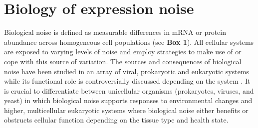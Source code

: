 
\section{Biology of expression noise} 

Biological noise is defined as measurable differences in \gls{mRNA} or protein abundance across homogeneous cell populations (see \textbf{Box 1}). All cellular systems are exposed to varying levels of noise and employ strategies to make use of or cope with this source of variation. The sources and consequences of biological noise have been studied in an array of viral, prokaryotic and eukaryotic systems while its functional role is controversially discussed depending on the system \citep{Raj2010, Balazsi2011, Eldar2010}. It is crucial to differentiate between unicellular organisms (prokaryotes, viruses, and yeast) in which biological noise supports responses to environmental changes and higher, multicellular eukaryotic systems where biological noise either benefits or obstructs cellular function depending on the tissue type and health state.\\

